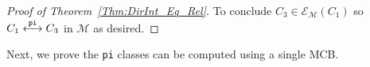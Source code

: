\documentclass[fleqn,11pt]{article}
\newcommand\calM{\mathcal{M}}
\newcommand\expand[2]{\mathcal{E}_{#1}\left(#2\right)}   %
\newcommand\symdiff{\mathop{\triangle}}
\newcommand\pInt{ \stackrel{\tt pi}{\longleftrightarrow} }
\begin{document}
\begin{proof}[Proof of Theorem~\ref{Thm:DirInt_Eq_Rel}]
	To conclude $C_3\in\expand{\calM}{C_1}$ so $C_1\pInt C_3$ in $\calM$ as desired.
\end{proof}

Next, we prove the {\tt pi} classes can be computed using a single MCB.
\end{document}
